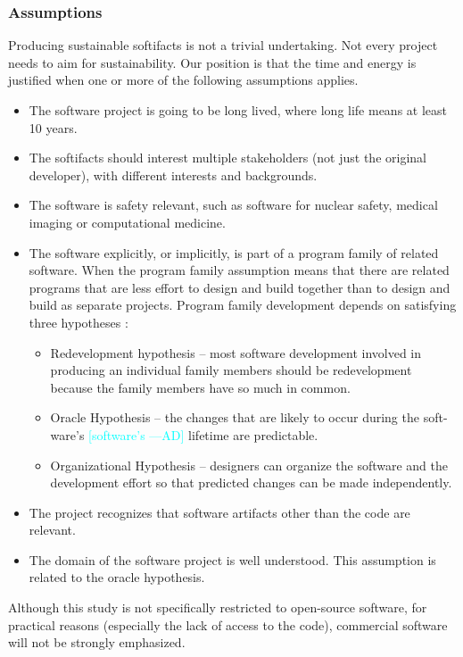 \documentclass[12pt]{article}
\newcommand{\authornote}[3]{\textcolor{#1}{[#3 ---#2]}}
\newcommand{\authornote}[3]{}
\newcommand{\ad}[1]{\authornote{cyan}{AD}{#1}} %
\begin{document}
\subsubsection*{Assumptions}

Producing sustainable softifacts is not a trivial undertaking.  Not
every project needs to aim for sustainability.  Our position is that the time
and energy is justified when one or more of the following assumptions applies.

\begin{itemize}
\item The software project is going to be long lived, where long life means at
  least 10 years.
\item The softifacts should interest multiple stakeholders (not just the
  original developer), with different interests and backgrounds.
\item The software is safety relevant, such as software for nuclear safety,
  medical imaging or computational medicine.
\item The software explicitly, or implicitly, is part of a program family of
  related software.  When the program family assumption means that there are
  related programs that are less effort to design and build together than to
  design and build as separate projects.  Program family development depends on
  satisfying three hypotheses \citep{Weiss1997}:
\begin{itemize}
\item Redevelopment hypothesis – most software development involved in producing
  an individual family members should be redevelopment because the family
  members have so much in common.
\item Oracle Hypothesis – the changes that are likely to occur during the soft-
  ware’s \ad{software's} lifetime are predictable.
\item Organizational Hypothesis – designers can organize the software and the
  development effort so that predicted changes can be made independently.
\end{itemize}
\item The project recognizes that software artifacts other than the code are
  relevant.
\item The domain of the software project is well understood.  This assumption is
  related to the oracle hypothesis.
\end{itemize}

Although this study is not specifically restricted to open-source software, for
practical reasons (especially the lack of access to the code), commercial
software will not be strongly emphasized.
\end{document}
